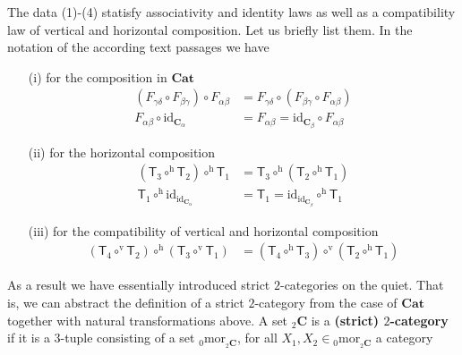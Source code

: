 The data (1)-(4) statisfy associativity and identity laws as well as a compatibility law of vertical and horizontal composition. Let us briefly list them. In the notation of the according text passages we have
\begin{enumerate}
\item[(i)]
for the composition in $\mathbf{Cat}$
\begin{align*}
  \left(
    F_{\gamma\delta}
    \circ
    F_{\beta\gamma}
  \right)
  \circ
  F_{\alpha\beta}
  &=
  F_{\gamma\delta}
  \circ
  \left(
    F_{\beta\gamma}
    \circ
    F_{\alpha\beta}
  \right)
  \\
  F_{\alpha\beta}
  \circ
  \mathrm{id}_{\mathbf{C}_{\alpha}}
  &=
  F_{\alpha\beta}
  =
  \mathrm{id}_{\mathbf{C}_{\beta}}
  \circ
  F_{\alpha\beta}
\end{align*}
\item[(ii)]
for the horizontal composition
\begin{align*}
  \left(
    \mathsf{T}_{3}
    \circ^{\textrm{h}}
    \mathsf{T}_{2}
  \right)
  \circ^{\textrm{h}}
  \mathsf{T}_{1}
  &=
  \mathsf{T}_{3}
  \circ^{\textrm{h}}
  \left(
    \mathsf{T}_{2}
    \circ^{\textrm{h}}
    \mathsf{T}_{1}
  \right)
  \\
  \mathsf{T}_{1}
  \circ^{\textrm{h}}
  \mathrm{id}_{\mathrm{id}_{\mathbf{C}_{\alpha}}}
  &=
  \mathsf{T}_{1}
  =
  \mathrm{id}_{\mathrm{id}_{\mathbf{C}_{\beta}}}
  \circ^{\textrm{h}}
  \mathsf{T}_{1}
\end{align*}
\item[(iii)]
for the compatibility of vertical and horizontal composition
\begin{align*}
  \left(
    \mathsf{T}_{4}
    \circ^{\textrm{v}}
    \mathsf{T}_{2}
  \right)
  \circ^{\textrm{h}}
  \left(
    \mathsf{T}_{3}
    \circ^{\textrm{v}}
    \mathsf{T}_{1}
  \right)
  &=
  \left(
    \mathsf{T}_{4}
    \circ^{\textrm{h}}
    \mathsf{T}_{3}
  \right)
  \circ^{\textrm{v}}
  \left(
    \mathsf{T}_{2}
    \circ^{\textrm{h}}
    \mathsf{T}_{1}
  \right)
\end{align*}
\end{enumerate}
As a result we have essentially introduced strict $2$-categories on the quiet. That is, we can abstract the definition of a strict $2$-category from the case of $\mathbf{Cat}$ together with natural transformations above. A set ${}_{2}\mathbf{C}$ is a \textbf{(strict) $2$-category} if it is a $3$-tuple consisting of a set ${}_{0}\mathrm{mor}_{{}_{2}\mathbf{C}}$, for all $X_{1},X_{2} \in {}_{0}\mathrm{mor}_{_{2}\mathbf{C}}$ a category

